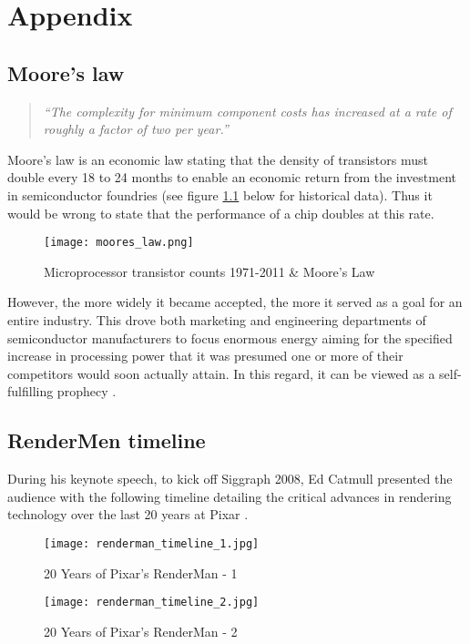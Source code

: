 \chapter{Appendix}
\label{appendix0}

\section{Moore's law}
\label{appendix1}

\begin{quote} \textit{``The complexity for minimum component costs has increased at a rate of roughly a factor of two per year.''} \citep[p.115]{Moore1965} \end{quote}
Moore’s law is an economic law stating that the density of transistors must double every 18 to 24 months to enable an economic return from the investment in semiconductor foundries (see figure \ref{fig:moores_law} below for historical data).
Thus it would be wrong to state that the performance of a chip doubles at this rate.
\vspace*{-1ex}
\begin{figure}[ht]
\centering
\texttt{[image: moores\_law.png]}
\caption{Microprocessor transistor counts 1971-2011 \& Moore's Law}
\label{fig:moores_law}
\end{figure}
However, the more widely it became accepted, the more it served as a goal for an entire industry.
This drove both marketing and engineering departments of semiconductor manufacturers to focus enormous energy aiming for the specified increase in processing power that it was presumed one or more of their competitors would soon actually attain.
In this regard, it can be viewed as a self-fulfilling prophecy \citep[cf.][]{Paul2006, Crvelin2012}.

\newpage
\section{RenderMen timeline}
\label{appendix2}

During his keynote speech, to kick off Siggraph 2008, Ed Catmull presented the audience with the following timeline detailing the critical advances in rendering technology over the last 20 years at Pixar \citep[cf.][]{Seymour2008}.
\begin{figure}[ht]
\centering
\texttt{[image: renderman\_timeline\_1.jpg]}
\caption{20 Years of Pixar's RenderMan - 1}
\label{fig:renderman_timeline_1}
\end{figure}
\begin{figure}[ht]
\centering
\texttt{[image: renderman\_timeline\_2.jpg]}
\caption{20 Years of Pixar's RenderMan - 2}
\label{fig:renderman_timeline_2}
\end{figure}


